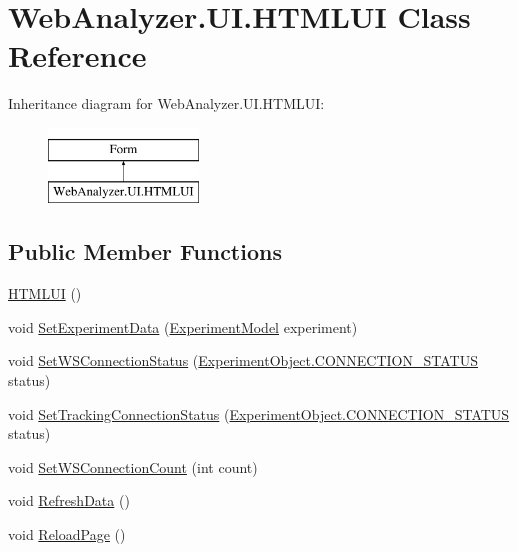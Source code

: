 \hypertarget{class_web_analyzer_1_1_u_i_1_1_h_t_m_l_u_i}{}\section{Web\+Analyzer.\+U\+I.\+H\+T\+M\+L\+U\+I Class Reference}
\label{class_web_analyzer_1_1_u_i_1_1_h_t_m_l_u_i}
Inheritance diagram for Web\+Analyzer.\+U\+I.\+H\+T\+M\+L\+U\+I\+:\begin{figure}[H]
\begin{center}
\leavevmode
\includegraphics[height=2.000000cm]{class_web_analyzer_1_1_u_i_1_1_h_t_m_l_u_i}
\end{center}
\end{figure}
\subsection*{Public Member Functions}
\begin{DoxyCompactItemize}
\item 
\hyperlink{class_web_analyzer_1_1_u_i_1_1_h_t_m_l_u_i_aaaa68b7c3f90ecdd0bf051d1661004a4}{H\+T\+M\+L\+U\+I} ()
\item 
void \hyperlink{class_web_analyzer_1_1_u_i_1_1_h_t_m_l_u_i_ac06665c3130dee5b5d7676b7ea5589d4}{Set\+Experiment\+Data} (\hyperlink{class_web_analyzer_1_1_models_1_1_base_1_1_experiment_model}{Experiment\+Model} experiment)
\item 
void \hyperlink{class_web_analyzer_1_1_u_i_1_1_h_t_m_l_u_i_aceec55dc8dd89be1fcbfa8a7184d3715}{Set\+W\+S\+Connection\+Status} (\hyperlink{class_web_analyzer_1_1_u_i_1_1_interaction_objects_1_1_experiment_object_a2875208b4f4b0ed643593152f4ec025c}{Experiment\+Object.\+C\+O\+N\+N\+E\+C\+T\+I\+O\+N\+\_\+\+S\+T\+A\+T\+U\+S} status)
\item 
void \hyperlink{class_web_analyzer_1_1_u_i_1_1_h_t_m_l_u_i_aa012cb8155f5ab3dfc93b564f8a76faa}{Set\+Tracking\+Connection\+Status} (\hyperlink{class_web_analyzer_1_1_u_i_1_1_interaction_objects_1_1_experiment_object_a2875208b4f4b0ed643593152f4ec025c}{Experiment\+Object.\+C\+O\+N\+N\+E\+C\+T\+I\+O\+N\+\_\+\+S\+T\+A\+T\+U\+S} status)
\item 
void \hyperlink{class_web_analyzer_1_1_u_i_1_1_h_t_m_l_u_i_a00b81504075fbc78a43776c2688b3ffd}{Set\+W\+S\+Connection\+Count} (int count)
\item 
void \hyperlink{class_web_analyzer_1_1_u_i_1_1_h_t_m_l_u_i_a25ca61f40127be0b7d381bbd17c0fd5e}{Refresh\+Data} ()
\item 
void \hyperlink{class_web_analyzer_1_1_u_i_1_1_h_t_m_l_u_i_a32d0bf8581afa8af866438d4ee76dd9f}{Reload\+Page} ()
\end{DoxyCompactItemize}
